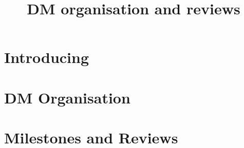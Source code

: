 \documentclass[]{lsstbeamer}
\title[DM Organisation]{DM organisation and reviews  }
\begin{document}
\frame[plain]{\titlepage }
\section{Introducing}

\section{DM Organisation }


\section {Milestones and Reviews }



\end{document}
